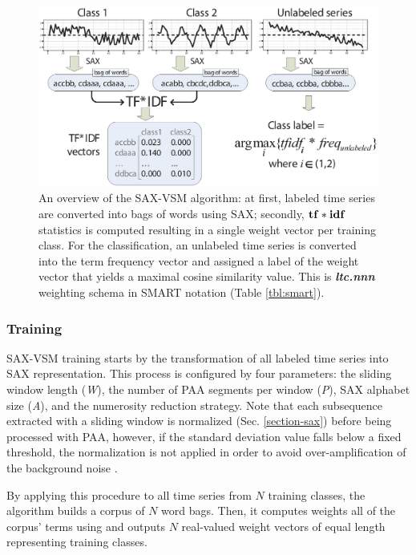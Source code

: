 \begin{figure}[t]
   \centering
   \includegraphics[width=148mm]{figures/SAX-VSM_overview.eps}
   \caption{
   An overview of the SAX-VSM algorithm: 
   at first, labeled time series are converted into bags of words using SAX; 
   secondly, $\text{\textbf{tf}}\ast\text{\textbf{idf}}$ statistics is computed resulting in 
   a single weight vector per training class. For the classification, an unlabeled 
   time series is converted into the term frequency vector and assigned a 
   label of the weight vector that yields a maximal cosine similarity value.
   This is \textit{\textbf{ltc.nnn}} weighting schema in SMART notation (Table \ref{tbl:smart}).}
   \label{fig:sax-vsm_overview}
\end{figure}

\subsubsection{Training}
SAX-VSM training starts by the transformation of all labeled time series into SAX representation. 
This process is configured by four parameters: 
the sliding window length (\textit{W}), 
the number of PAA segments per window (\textit{P}), 
SAX alphabet size (\textit{A}),
and the numerosity reduction strategy.
Note that each subsequence extracted with a sliding window is normalized (Sec. \ref{section-sax}) 
before being processed with PAA, however, if the standard deviation value falls below a fixed threshold, 
the normalization is not applied in order to avoid over-amplification of the background noise \cite{sax}. 

By applying this procedure to all time series from $N$ training classes, the algorithm builds a corpus of 
$N$ word bags. 
Then, it computes weights all of the corpus' terms using \tfidf and outputs $N$ real-valued weight vectors of 
equal length representing training classes. 

